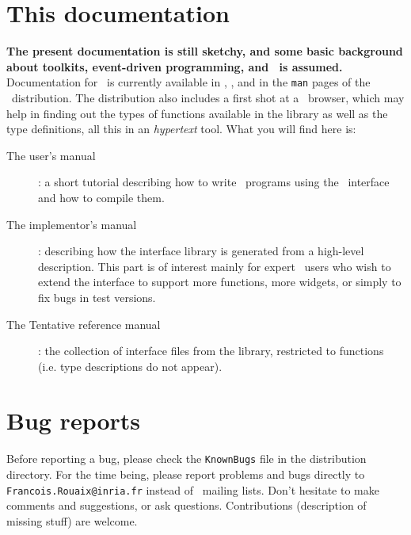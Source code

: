 \section*{This documentation}

{\bf The present documentation is still sketchy, and some basic background
about toolkits, event-driven programming, and \tk\ is assumed.}
Documentation for \tk\ is currently available in \cite{ouster94},
\cite{welch94}, and in the {\tt man} pages of the \tk\ distribution.
The distribution also includes a first shot at a \caml\ browser, which may
help in finding out the types of functions available in the library as well as
the type definitions, all this in an {\em hypertext} tool.
What you will find here is:
\begin{description}
\item[The user's manual] : a short tutorial describing how to write \caml\
programs using the \tk\ interface and how to compile them. 
\item[The implementor's manual] : describing how the interface library is
generated from a high-level description. This part is of interest mainly for
expert \tk\ users who wish to extend the interface to support more
functions, more widgets, or simply to fix bugs in test versions.
\item[The Tentative reference manual] : the collection of
interface files from the library, restricted to functions (i.e. type
descriptions do not appear). 
\end{description}

\section*{Bug reports}

Before reporting a bug, please check the \verb|KnownBugs| file in the
distribution directory.
For the time being, please report problems and bugs directly to
\verb|Francois.Rouaix@inria.fr| instead of \caml\ mailing lists.
Don't hesitate to make comments and suggestions, or ask questions.
Contributions (description of missing stuff) are welcome.







